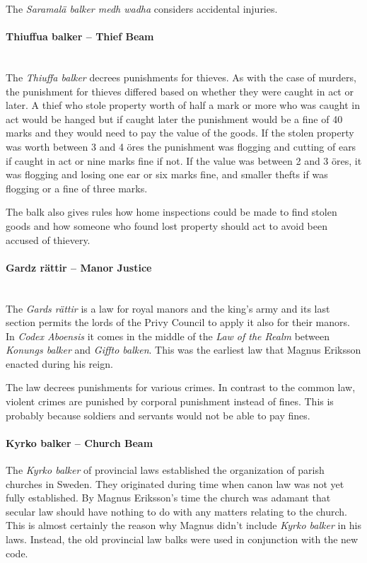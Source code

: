 \documentclass[a4paper]{article}
\begin{document}
The \emph{Saramalä balker medh wadha} considers accidental injuries. 

\paragraph {Thiuffua balker – Thief Beam} \mbox{}\\

The \emph{Thiuffa balker} decrees punishments for thieves. As with the
case of murders, the punishment for thieves differed based on whether
they were caught in act or later. A thief who stole property worth of
half a mark or more who was caught in act would be hanged but if
caught later the punishment would be a fine of 40 marks and they would
need to pay the value of the goods. If the stolen property was worth
between 3 and 4 öres the punishment was flogging and cutting of ears
if caught in act or nine marks fine if not. If the value was between 2
and 3 öres, it was flogging and losing one ear or six marks fine, and
smaller thefts if was flogging or a fine of three marks.

The balk also gives rules how home inspections could be made to find
stolen goods and how someone who found lost property should act to
avoid been accused of thievery.


\paragraph {Gardz rättir – Manor Justice} \mbox{}\\

The \emph{Gards rättir} is a law for royal manors and the king's army
and its last section permits the lords of the Privy Council to apply
it also for their manors. In \emph{Codex Aboensis} it comes in the
middle of the \emph{Law of the Realm} between \emph{Konungs balker}
and \emph{Giffto balken}. This was the earliest law that Magnus
Eriksson enacted during his reign.

The law decrees punishments for various crimes. In contrast to the
common law, violent crimes are punished by corporal punishment instead
of fines. This is probably because soldiers and servants would not be
able to pay fines.


\paragraph{Kyrko balker – Church Beam}

The \emph{Kyrko balker} of provincial laws established the
organization of parish churches in Sweden. They originated during time
when canon law was not yet fully established. By Magnus Eriksson's
time the church was adamant that secular law should have nothing to do
with any matters relating to the church. This is almost certainly the
reason why Magnus didn't include \emph{Kyrko balker} in his laws.
Instead, the old provincial law balks were used in conjunction with
the new code.
\end{document}
